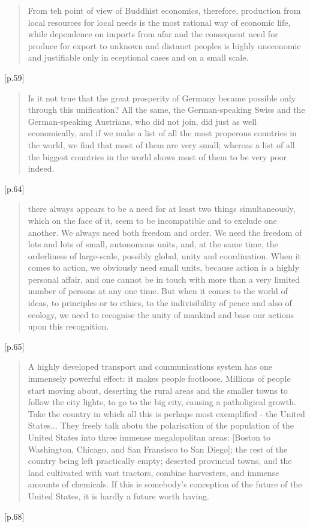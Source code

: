 \documentclass[letterpaper]{article}
\begin{document}
\begin{quote}
From teh point of view of Buddhist economics, therefore, production from local resources for local needs is the most rational way of economic life, while dependence on imports from afar and the consequent need for produce for export to unknown and distanct peoples is highly uneconomic and justifiable only in eceptional cases and on a small scale.
\end{quote} [p.59]

\begin{quote}
Is it not true that the great prosperity of Germany became possible only through this unification? All the same, the German-speaking Swiss and the German-speaking Austrians, who did not join, did just as well economically, and if we make a list of all the most properous countries in the world, we find that most of them are very small; whereas a list of all the biggest countries in the world shows most of them to be very poor indeed.
\end{quote} [p.64]

\begin{quote}
there always appears to be a need for at least two things simultaneously, which on the face of it, seem to be incompatible and to exclude one another. We always need both freedom and order. We need the freedom of lots and lots of small, autonomous units, and, at the same time, the orderliness of large-scale, possibly global, unity and coordination. When it comes to action, we obviously need small units, because action is a highly personal affair, and one cannot be in touch with more than a very limited number of persons at any one time. But when it comes to the world of ideas, to principles or to ethics, to the indivisibility of peace and also of ecology, we need to recognise the unity of mankind and base our actions upon this recognition.
\end{quote} [p.65]

\begin{quote}
A highly developed transport and communications system has one immensely powerful effect: it makes people footloose. Millions of people start moving about, deserting the rural areas and the smaller towns to follow the city lights, to go to the big city, causing a patholigical growth. Take the country in which all this is perhaps most exemplified - the United States... They freely talk abotu the polarisation of the population of the United States into three immense megalopolitan areas: [Boston to Washington, Chicago, and San Fransisco to San Diego]; the rest of the country being left practically empty; deserted provincial towns, and the land cultivated with vast tractors, combine harvesters, and immense amounts of chemicals. If this is somebody's conception of the future of the United States, it is hardly a future worth having.
\end{quote}[p.68]
\end{document}

